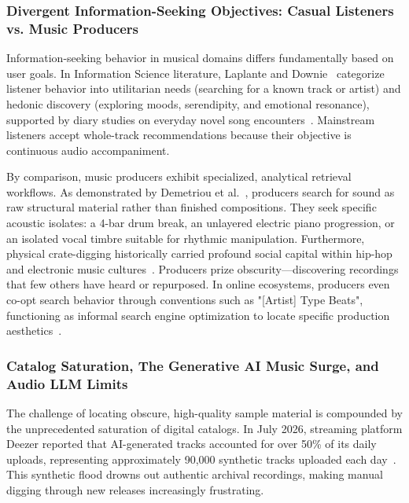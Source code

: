 \subsubsection*{Divergent Information-Seeking Objectives: Casual Listeners vs. Music Producers}
Information-seeking behavior in musical domains differs fundamentally based on user goals. In Information Science literature, Laplante and Downie~\cite{ref:laplante2006} categorize listener behavior into utilitarian needs (searching for a known track or artist) and hedonic discovery (exploring moods, serendipity, and emotional resonance), supported by diary studies on everyday novel song encounters~\cite{ref:cunningham2007, ref:garcia2018}. Mainstream listeners accept whole-track recommendations because their objective is continuous audio accompaniment.

By comparison, music producers exhibit specialized, analytical retrieval workflows. As demonstrated by Demetriou et al.~\cite{ref:demetriou2018}, producers search for sound as raw structural material rather than finished compositions. They seek specific acoustic isolates: a 4-bar drum break, an unlayered electric piano progression, or an isolated vocal timbre suitable for rhythmic manipulation. Furthermore, physical crate-digging historically carried profound social capital within hip-hop and electronic music cultures~\cite{ref:schloss2014, ref:vice2014}. Producers prize obscurity---discovering recordings that few others have heard or repurposed. In online ecosystems, producers even co-opt search behavior through conventions such as "[Artist] Type Beats", functioning as informal search engine optimization to locate specific production aesthetics~\cite{ref:musicradar2023_typebeat}.

\subsubsection*{Catalog Saturation, The Generative AI Music Surge, and Audio LLM Limits}
The challenge of locating obscure, high-quality sample material is compounded by the unprecedented saturation of digital catalogs. In July 2026, streaming platform Deezer reported that AI-generated tracks accounted for over 50\% of its daily uploads, representing approximately 90,000 synthetic tracks uploaded each day~\cite{ref:techcrunch2026_deezer}. This synthetic flood drowns out authentic archival recordings, making manual digging through new releases increasingly frustrating.

